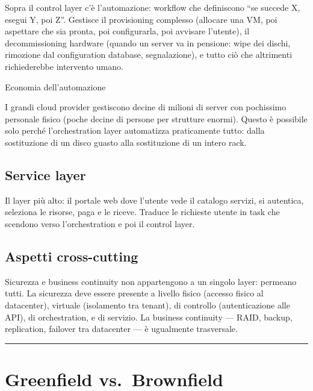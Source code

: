 \documentclass[
  italian,
  openany]{book}
\begin{document}
Sopra il control layer c'è l'automazione: workflow che definiscono ``se
succede X, esegui Y, poi Z''. Gestisce il provisioning complesso
(allocare una VM, poi aspettare che sia pronta, poi configurarla, poi
avvisare l'utente), il decommissioning hardware (quando un server va in
pensione: wipe dei dischi, rimozione dal configuration database,
segnalazione), e tutto ciò che altrimenti richiederebbe intervento
umano.

\begin{callouttip}{Economia dell’automazione}

I grandi cloud provider gestiscono decine di milioni di server con
pochissimo personale fisico (poche decine di persone per strutture
enormi). Questo è possibile solo perché l'orchestration layer
automatizza praticamente tutto: dalla sostituzione di un disco guasto
alla sostituzione di un intero rack.

\end{callouttip}

\subsection{Service layer}\label{service-layer}

Il layer più alto: il portale web dove l'utente vede il catalogo
servizi, si autentica, seleziona le risorse, paga e le riceve. Traduce
le richieste utente in task che scendono verso l'orchestration e poi il
control layer.

\subsection{Aspetti cross-cutting}\label{aspetti-cross-cutting}

Sicurezza e business continuity non appartengono a un singolo layer:
permeano tutti. La sicurezza deve essere presente a livello fisico
(accesso fisico al datacenter), virtuale (isolamento tra tenant), di
controllo (autenticazione alle API), di orchestration, e di servizio. La
business continuity --- RAID, backup, replication, failover tra
datacenter --- è ugualmente trasversale.

\begin{center}\rule{0.5\linewidth}{0.5pt}\end{center}

\section{Greenfield vs.~Brownfield}\label{greenfield-vs.-brownfield}
\end{document}
